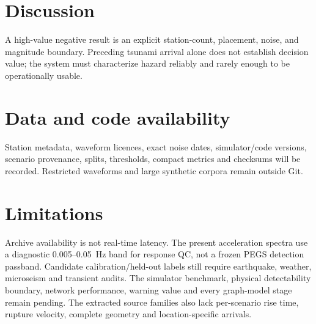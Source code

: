 \documentclass[11pt]{article}
\begin{document}
\section{Discussion}
A high-value negative result is an explicit station-count, placement, noise, and
magnitude boundary. Preceding tsunami arrival alone does not establish decision
value; the system must characterize hazard reliably and rarely enough to be
operationally usable.

\section{Data and code availability}
Station metadata, waveform licences, exact noise dates, simulator/code versions,
scenario provenance, splits, thresholds, compact metrics and checksums will be
recorded. Restricted waveforms and large synthetic corpora remain outside Git.

\section{Limitations}
Archive availability is not real-time latency. The present acceleration spectra
use a diagnostic 0.005--0.05~Hz band for response QC, not a frozen PEGS detection
passband. Candidate calibration/held-out labels still require earthquake,
weather, microseism and transient audits. The simulator benchmark, physical
detectability boundary, network performance, warning value and every graph-model
stage remain pending. The extracted source families also lack per-scenario rise
time, rupture velocity, complete geometry and location-specific arrivals.



\end{document}
